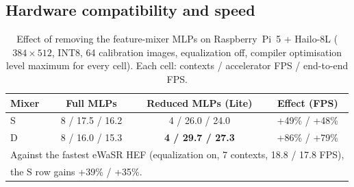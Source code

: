 \documentclass[conference]{IEEEtran}
\begin{document}
\subsection{Hardware compatibility and speed}
\label{sec:hw}
\begin{table}[t]
\centering
\caption{Effect of removing the feature-mixer MLPs on Raspberry~Pi~5 + Hailo-8L ($384\times512$, INT8, 64 calibration images, equalization off, compiler optimisation level maximum for every cell). Each cell: contexts / accelerator FPS / end-to-end FPS.}
\label{tab:c1}
\setlength{\tabcolsep}{3pt}
\begin{tabular}{lccc}
\toprule
Mixer & Full MLPs & Reduced MLPs (Lite) & Effect (FPS) \\
\midrule
S & 8 / 17.5 / 16.2 & 4 / 26.0 / 24.0 & +49\% / +48\% \\
D & 8 / 16.0 / 15.3 & \textbf{4 / 29.7 / 27.3} & +86\% / +79\% \\
\bottomrule
\multicolumn{4}{l}{\footnotesize Against the fastest eWaSR HEF (equalization on, 7 contexts, 18.8 / 17.8 FPS),}\\
\multicolumn{4}{l}{\footnotesize the S row gains +39\% / +35\%.}
\end{tabular}
\end{table}
\end{document}
